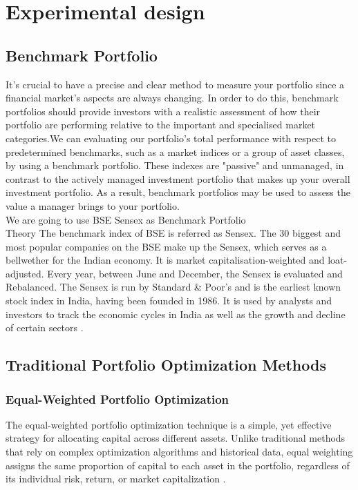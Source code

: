 \chapter{Experimental design}
\section{Benchmark Portfolio}
It's crucial to have a precise and clear method to measure your portfolio since a financial market's aspects are always changing. In order to do this, benchmark portfolios should provide investors with a realistic assessment of how their portfolio are performing relative to the important and specialised market categories.We can evaluating our portfolio's total performance with respect to predetermined benchmarks, such as a market indices or a group of asset classes, by using a benchmark portfolio. These indexes are "passive" and unmanaged, in contrast to the actively managed investment portfolio that makes up your overall investment portfolio. As a result, benchmark portfolios may be used to assess the value a manager brings to your portfolio.\\
We are going to use BSE Sensex as Benchmark Portfolio\\
Theory The benchmark index of BSE is referred as Sensex. The 30 biggest and most
popular companies on the BSE make up the Sensex, which serves as a bellwether for the Indian economy. It is market capitalisation-weighted and loat-adjusted. Every year, between June and December, the Sensex is evaluated and Rebalanced. The Sensex is run by Standard \& Poor's and is the earliest known stock index in India, having been founded in 1986. It is used by analysts and investors to track the economic cycles in India as well as the growth and decline of certain sectors \cite{Ma2021} .
\section{Traditional Portfolio Optimization Methods}

\subsection{Equal-Weighted Portfolio Optimization}
The equal-weighted portfolio optimization technique is a simple, yet effective strategy for allocating capital across different assets. Unlike traditional methods that rely on complex optimization algorithms and historical data, equal weighting assigns the same proportion of capital to each asset in the portfolio, regardless of its individual risk, return, or market capitalization \cite{DeMiguel20091915}.

